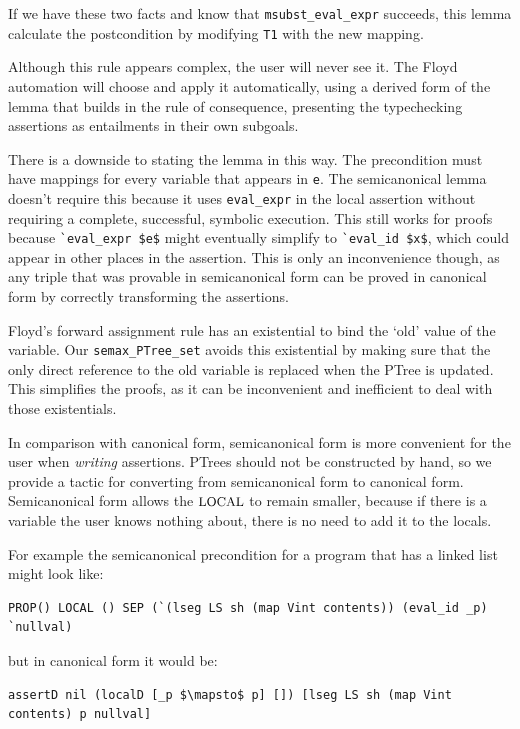 \documentclass{puthesis}
\begin{document}
If we have these two facts and know that \lstinline|msubst_eval_expr|
succeeds, this lemma calculate the postcondition by modifying
\lstinline|T1| with the new mapping.

Although this rule appears complex, the user will never see it. The
Floyd automation will choose and apply it automatically, using a
derived form of the lemma that builds in the rule of consequence,
presenting the typechecking assertions as entailments in their own
subgoals.

There is a downside to stating the lemma in this way. The precondition
must have mappings for every variable that appears in \lstinline|e|. The
semicanonical lemma doesn't require this because it uses
\lstinline|eval_expr| in the local assertion without requiring a
complete, successful, symbolic execution. This still works for proofs
because \lstinline|`eval_expr $e$| might eventually simplify to
\lstinline|`eval_id $x$|, which could appear in other places in the
assertion. This is only an inconvenience though, as any triple that
was provable in semicanonical form can be proved in canonical form by
correctly transforming the assertions.

Floyd's forward assignment rule has an existential to bind the `old'
value of the variable.  Our \lstinline|semax_PTree_set| avoids this
existential by making sure that the only direct reference to the old
variable is replaced when the PTree is updated.  This simplifies the
proofs, as it can be inconvenient and inefficient to deal with those
existentials.

In comparison with canonical form, semicanonical form is more
convenient for the user when \emph{writing} assertions. PTrees should
not be constructed by hand, so we provide a tactic for converting from
semicanonical form to canonical form. Semicanonical form allows the
$\mbox{\small LOCAL}$ to remain smaller, because if there is a variable the user
knows nothing about, there is no need to add it to the locals. 

For example the semicanonical precondition for a program that has a linked list
might look like:

\begin{lstlisting}
PROP() LOCAL () SEP (`(lseg LS sh (map Vint contents)) (eval_id _p) `nullval)
\end{lstlisting}

but in canonical form it would be:

\begin{lstlisting}
assertD nil (localD [_p $\mapsto$ p] []) [lseg LS sh (map Vint contents) p nullval]
\end{lstlisting}
\end{document}
